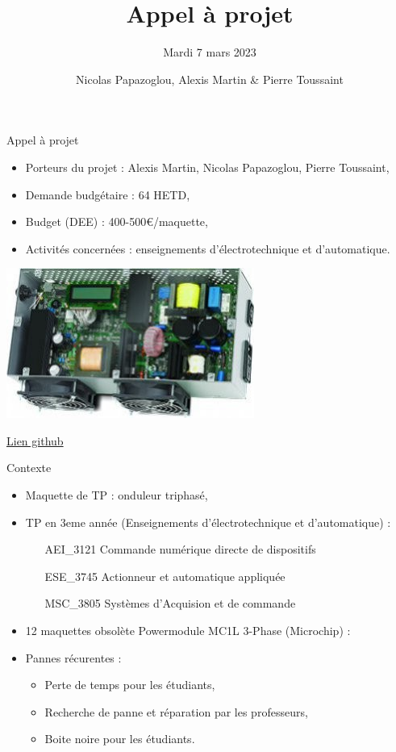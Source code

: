 \documentclass[aspectratio=169]{beamer}
\title{Appel à projet}
\subtitle{Mardi 7 mars 2023}
\date{}
\author[N.P. - A.M. - P.T.]{Nicolas Papazoglou, Alexis Martin \& Pierre Toussaint}
\institute[ENSEA]{ENSEA}
\begin{document}
\begin{frame}
	\titlepage
\end{frame}

\begin{frame}{Appel à projet}
\begin{minipage}{0.49\textwidth}
	\begin{itemize}
		\item Porteurs du projet : Alexis Martin, Nicolas Papazoglou, Pierre Toussaint,
		\item Demande budgétaire : 64 HETD,
		\item Budget (DEE) : 400-500\euro/maquette,
		\item Activités concernées : enseignements d'électrotechnique et d'automatique.
	\end{itemize}
\end{minipage}
\begin{minipage}{0.49\textwidth}
	\includegraphics[scale=0.6]{figures/inverter.jpeg} 
\end{minipage}
\center \href{https://github.com/DBXYD/AAP_ENSEA_Inverter}{Lien github}
\end{frame}

\begin{frame}{Contexte}
\begin{itemize}
	\item Maquette de TP : onduleur triphasé,
	\item TP en 3eme année (Enseignements d'électrotechnique et d'automatique) : 
	\begin{itemize}
	\item [AEI\_3121] Commande numérique directe de dispositifs
	\item [ESE\_3745] Actionneur et automatique appliquée
	\item [MSC\_3805] Systèmes d'Acquision et de commande
	\end{itemize}
	\item 12 maquettes obsolète Powermodule MC1L 3-Phase (Microchip) : 
	\item Pannes récurentes :
	\begin{itemize}
		\item Perte de temps pour les étudiants,
		\item Recherche de panne et réparation par les professeurs,
		\item Boite noire pour les étudiants.		
	\end{itemize}
\end{itemize}
\end{frame}
\end{document}
